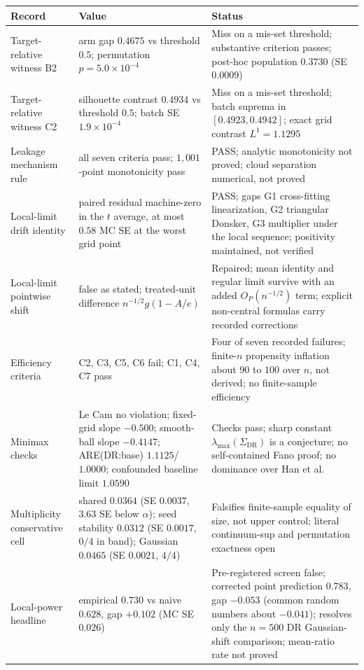 \begin{table}[t]
\centering
\small
\setlength{\tabcolsep}{4pt}
\begin{tabularx}{\textwidth}{@{}>{\raggedright\arraybackslash}p{3.6cm}>{\raggedright\arraybackslash}p{5.2cm}>{\raggedright\arraybackslash}X@{}}
\hline
Record & Value & Status \\
\hline
Target-relative witness B2 & arm gap $0.4675$ vs threshold $0.5$; permutation $p=5.0\times10^{-4}$ & Miss on a mis-set threshold; substantive criterion passes; post-hoc population $0.3730$ (SE $0.0009$) \\
Target-relative witness C2 & silhouette contrast $0.4934$ vs threshold $0.5$; batch SE $1.9\times10^{-4}$ & Miss on a mis-set threshold; batch suprema in $[0.4923,0.4942]$; exact grid contrast $L^1=1.1295$ \\
Leakage mechanism rule & all seven criteria pass; $1{,}001$-point monotonicity pass & PASS; analytic monotonicity not proved; cloud separation numerical, not proved \\
Local-limit drift identity & paired residual machine-zero in the $t$ average, at most $0.58$ MC SE at the worst grid point & PASS; gaps G1 cross-fitting linearization, G2 triangular Donsker, G3 multiplier under the local sequence; positivity maintained, not verified \\
Local-limit pointwise shift & false as stated; treated-unit difference $n^{-1/2}g(1-A/e)$ & Repaired; mean identity and regular limit survive with an added $O_P(n^{-1/2})$ term; explicit non-central formulas carry recorded corrections \\
Efficiency criteria & C2, C3, C5, C6 fail; C1, C4, C7 pass & Four of seven recorded failures; finite-$n$ propensity inflation about $90$ to $100$ over $n$, not derived; no finite-sample efficiency \\
Minimax checks & Le Cam no violation; fixed-grid slope $-0.500$; smooth-ball slope $-0.4147$; ARE(DR:base) $1.1125$/$1.0000$; confounded baseline limit $1.0590$ & Checks pass; sharp constant $\lambda_{\max}(\Sigma_{\mathrm{DR}})$ is a conjecture; no self-contained Fano proof; no dominance over Han et al. \\
Multiplicity conservative cell & shared $0.0364$ (SE $0.0037$, $3.63$ SE below $\alpha$); seed stability $0.0312$ (SE $0.0017$, $0/4$ in band); Gaussian $0.0465$ (SE $0.0021$, $4/4$) & Falsifies finite-sample equality of size, not upper control; literal continuum-sup and permutation exactness open \\
Local-power headline & empirical $0.730$ vs naive $0.628$, gap $+0.102$ (MC SE $0.026$) & Pre-registered screen false; corrected point prediction $0.783$, gap $-0.053$ (common random numbers about $-0.041$); resolves only the $n=500$ DR Gaussian-shift comparison; mean-ratio rate not proved \\

\end{tabularx}
\end{table}
